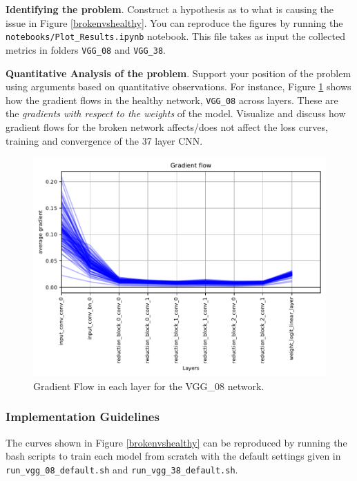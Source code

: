 \documentclass[11pt,]{article}
\begin{document}
\textbf{Identifying the problem}. Construct a hypothesis as to what is causing the issue in Figure \ref{brokenvshealthy}. You can reproduce the figures by running the \texttt{notebooks/Plot\_Results.ipynb} notebook. This file takes as input the collected metrics in folders \texttt{VGG\_08} and \texttt{VGG\_38}.

\textbf{Quantitative Analysis of the problem}. Support your position of the problem using arguments based on quantitative observations. For instance, Figure \ref{fig:healthygradient} shows how the gradient flows in the healthy network, \texttt{VGG\_08} across layers. These are the \textit{gradients with respect to the weights} of the model. Visualize and discuss how gradient flows for the broken network affects/does not affect the loss curves, training and convergence of the 37 layer CNN.  




\begin{figure}
\centering
  \includegraphics[width=0.8\linewidth]{grad_flow_vgg08.pdf}

\caption{Gradient Flow in each layer for the VGG\_08 network.}
\label{fig:healthygradient}
\end{figure}

\subsubsection{Implementation Guidelines}\label{block-implementation-notes}

The curves shown in Figure \ref{brokenvshealthy} can be reproduced by running the bash scripts to train each model from scratch with the default settings given in \texttt{run\_vgg\_08\_default.sh} and \texttt{run\_vgg\_38\_default.sh}. 
\end{document}
